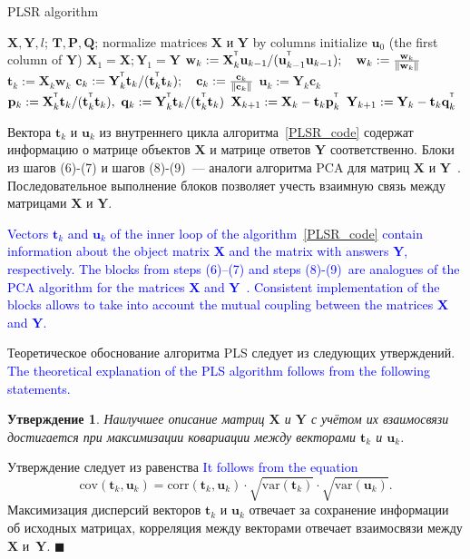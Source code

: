 \documentclass[12pt,twoside]{article}
\newtheorem{statement}{Утверждение}
\newcommand{\bw}{\mathbf{w}}
\newcommand{\bY}{\mathbf{Y}}
\newcommand{\bX}{\mathbf{X}}
\newcommand{\bu}{\mathbf{u}}
\newcommand{\bt}{\mathbf{t}}
\newcommand{\bp}{\mathbf{p}}
\newcommand{\bq}{\mathbf{q}}
\newcommand{\bc}{\mathbf{c}}
\newcommand{\bP}{\mathbf{P}}
\newcommand{\bT}{\mathbf{T}}
\newcommand{\bQ}{\mathbf{Q}}
\newcommand{\T}{^{\text{\tiny\sffamily\upshape\mdseries T}}}
\begin{document}
\begin{algorithm}[h]
\caption{PLSR algorithm}
\label{PLSR_code}
\begin{algorithmic}[1]
	\REQUIRE $\bX, \bY, l$;
	\ENSURE $\bT, \bP, \bQ$;
	\STATE normalize matrices $\bX$ и $\bY$ by columns
	\STATE initialize $\bu_0$ (the first column of $\bY$)
	\STATE $\bX_1 = \bX; \bY_1 = \bY$
	\REPEAT
	\vspace{0.1cm}
	\STATE $\bw_k := \bX_k^{\T} \bu_{k-1} / (\bu_{k-1}^{\T} \bu_{k-1}); \quad \bw_k: = \frac{\bw_k}{\| \bw_k \|}$
	\vspace{0.1cm}
	\STATE $\bt_k := \bX_k \bw_k$
	\vspace{0.1cm}
	\STATE $\bc_k := \bY_k^{\T} \bt_k / (\bt_k^{\T} \bt_k); \quad \bc_k: = \frac{\bc_k}{\| \bc_k \|}$
	\vspace{0.1cm}
	\STATE $\bu_k := \bY_k \bc_k$
	\UNTIL{$\bt_k$ stabilizes}
	\vspace{0.1cm}
	\STATE $\bp_k:= \bX_k^{\T}\bt_k/(\bt_k^{\T}\bt_k),\ 
	\bq_k := \bY_k^{\T}\bt_k/(\bt_k^{\T}\bt_k)$
	\vspace{0.2cm}
	\STATE $\bX_{k+1} :=  \bX_k - \bt_k \bp_k^{\T}$
	\vspace{0.2cm}
	\STATE $\bY_{k + 1} :=  \bY_k - \bt_k \bq_k^{\T}$ 
	\ENDFOR
\end{algorithmic}
\end{algorithm}
Вектора $\bt_k$ и $\bu_k$ из внутреннего цикла алгоритма~\ref{PLSR_code}
содержат информацию о матрице объектов $\bX$ и матрице ответов $\bY$ соответственно. 
Блоки из шагов (6)-(7) и шагов (8)-(9)~--- аналоги алгоритма PCA для матриц $\bX$ и $\bY$~\cite{geladi1986partial}. 
Последовательное выполнение блоков позволяет учесть взаимную связь между матрицами $\bX$ и $\bY$.

\textcolor{blue}{
Vectors $\bt_k$ and $\bu_k$ of the inner loop of the algorithm~\ref{PLSR_code} contain information about the object matrix $\bX$ and the matrix with answers $\bY$, respectively. 
The blocks from steps (6)--(7) and steps (8)-(9)~are analogues of the PCA algorithm for the matrices $\bX$ and $\bY$~\cite{geladi1986partial}. 
Consistent implementation of the blocks allows to take into account the mutual coupling between the matrices $\bX$ and $\bY$.}

Теоретическое обоснование алгоритма PLS следует из следующих утверждений.
\textcolor{blue}{The theoretical explanation of the PLS algorithm follows from the following statements.}
\begin{statement}
Наилучшее описание матриц $\bX$ и $\bY$ с учётом их взаимосвязи достигается при максимизации ковариации между векторами $\bt_k$ и $\bu_k$. 
\end{statement}
Утверждение следует из равенства
\textcolor{blue}{It follows from the equation}
\[
\text{cov} (\bt_k, \bu_k) = \text{corr} (\bt_k, \bu_k) \cdot \sqrt{\text{var}(\bt_k)} \cdot \sqrt{\text{var}(\bu_k)}.
\]
Максимизация дисперсий векторов $\bt_k$ и $\bu_k$ отвечает за сохранение информации об исходных матрицах, 
корреляция между векторами отвечает взаимосвязи между $\bX$ и~$\bY$. $\blacksquare$
\end{document}

